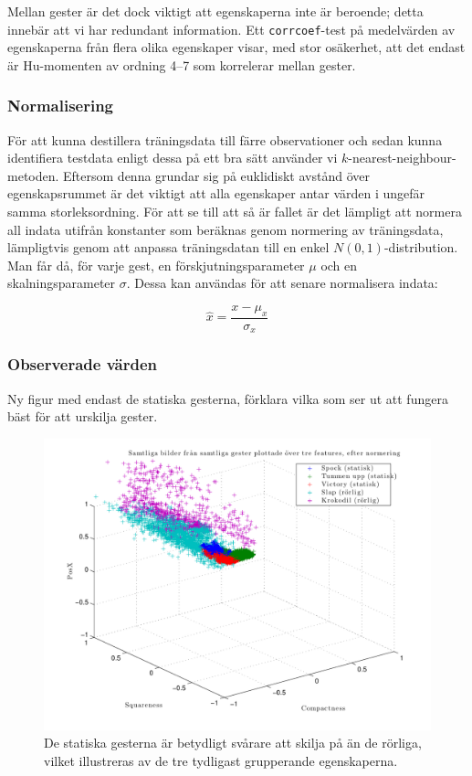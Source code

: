 \documentclass[../rapport_MVEX01-11-05]{subfiles}
\begin{document}
Mellan gester är det dock viktigt att egenskaperna inte är beroende;
detta innebär att vi har redundant information. Ett
\texttt{corrcoef}-test på medelvärden av egenskaperna från flera olika
egenskaper visar, med stor osäkerhet, att det endast är Hu-momenten av
ordning 4--7 som korrelerar mellan gester.

\subsubsection{Normalisering}

För att kunna destillera träningsdata till färre observationer och sedan
kunna identifiera testdata enligt dessa på ett bra sätt använder vi
$k$-nearest-neighbour-metoden. Eftersom denna grundar sig på euklidiskt
avstånd över egenskapsrummet är det viktigt att alla egenskaper antar värden
i ungefär samma storleksordning. För att se till att så är fallet är det
lämpligt att normera all indata utifrån konstanter som beräknas genom
normering av träningsdata, lämpligtvis genom att anpassa träningsdatan till en
enkel $N(0,1)$-distribution. Man får då, för varje gest, en
förskjutningsparameter $\mu$ och en skalningsparameter $\sigma$. Dessa kan
användas för att senare normalisera indata:

\begin{equation*}
	\hat{x} = \frac{x - \mu_x}{\sigma_x}
\end{equation*}

\subsubsection{Observerade värden}

Ny figur med endast de statiska gesterna, förklara vilka som ser ut
att fungera bäst för att urskilja gester.

\begin{figure}[htbp]
  \centering
  \includegraphics[width=\textwidth]{bilder/feats-1+6+7}
  \caption{De statiska gesterna är betydligt svårare att skilja på än
  de rörliga, vilket illustreras av de tre tydligast grupperande
  egenskaperna.}
  \label{fig:feats167}
\end{figure}
\end{document}
